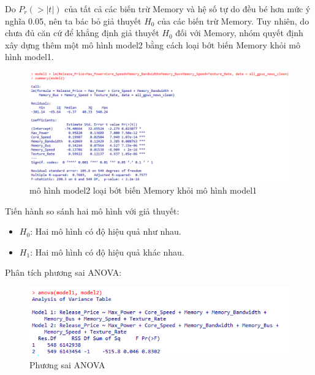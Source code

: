 \documentclass[a4paper]{article}
\newcommand{\gachdau}{\hspace*{1.5em}\ignorespaces}
\begin{document}
            \vspace{-16pt}
            \hspace{1pt}
            Do $P_r (> |t|)$ của tất cả các biến trừ Memory và hệ số tự do đều bé hơn mức ý nghĩa 0.05, nên ta bác bỏ giả thuyết $H_0$ của các biến trừ Memory. Tuy nhiên, do chưa đủ căn cứ để khẳng định giả thuyết $H_0$ đối với Memory, nhóm quyết định xây dựng thêm một mô hình model2 bằng cách loại bớt biến Memory khỏi mô hình model1.

\newpage
            \begin{figure}[H]
                \vspace{-5pt}
                \centering
                \includegraphics[width=\linewidth]{4. GPU/Thống kê suy diễn/model2.png}
                \caption{mô hình model2 loại bớt biến Memory khỏi mô hình model1}
            \end{figure}
            \vspace{-16pt}
            \hspace{1pt}
            Tiến hành so sánh hai mô hình với giả thuyết:
            \begin{itemize}[leftmargin=3.5em, itemsep=-1.5em, parsep=1.6em]
                \vspace{-6pt}
                \item \fontsize{13pt}{15pt}\selectfont $H_0$: Hai mô hình có độ hiệu quả như nhau.
                \item \fontsize{13pt}{15pt}\selectfont $H_1$: Hai mô hình có độ hiệu quả khác nhau.
            \end{itemize}
            \vspace{-7pt}
            \gachdau
            Phân tích phương sai ANOVA:
            \begin{figure}[H]
                \vspace{-5pt}
                \centering
                \includegraphics[width=\linewidth]{4. GPU/Thống kê suy diễn/ANOVA.png}
                \caption{Phương sai ANOVA}
            \end{figure}
\end{document}
